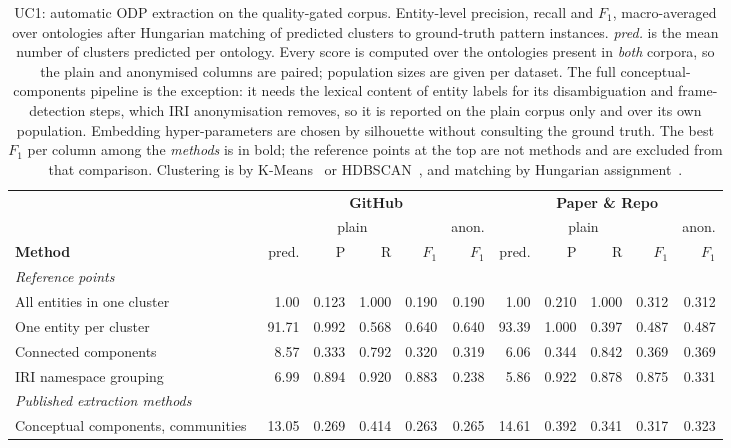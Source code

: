 \begin{table}[t]
\centering
\caption{UC1: automatic ODP extraction on the quality-gated corpus. Entity-level precision, recall and $F_1$, macro-averaged over ontologies after Hungarian matching of predicted clusters to ground-truth pattern instances. \emph{pred.} is the mean number of clusters predicted per ontology. Every score is computed over the ontologies present in \emph{both} corpora, so the plain and anonymised columns are paired; population sizes are given per dataset. The full conceptual-components pipeline is the exception: it needs the lexical content of entity labels for its disambiguation and frame-detection steps, which IRI anonymisation removes, so it is reported on the plain corpus only and over its own population. Embedding hyper-parameters are chosen by silhouette without consulting the ground truth. The best $F_1$ per column among the \emph{methods} is in bold; the reference points at the top are not methods and are excluded from that comparison. Clustering is by K-Means~\cite{lloyd1982kmeans} or HDBSCAN~\cite{campello2013hdbscan}, and matching by Hungarian assignment~\cite{kuhn1955hungarian}.}
\label{tab:uc1_all_methods}
\setlength{\tabcolsep}{4pt}
\footnotesize
\begin{tabular}{l|rrrr|r|rrrr|r}
\toprule
& \multicolumn{5}{c|}{\textbf{GitHub}} & \multicolumn{5}{c}{\textbf{Paper \& Repo}} \\
& \multicolumn{4}{c|}{plain} & anon. & \multicolumn{4}{c|}{plain} & anon. \\
\textbf{Method} & pred. & P & R & $F_1$ & $F_1$ & pred. & P & R & $F_1$ & $F_1$ \\
\midrule
\multicolumn{11}{l}{\textit{Reference points}} \\
All entities in one cluster & 1.00 & 0.123 & 1.000 & 0.190 & 0.190 & 1.00 & 0.210 & 1.000 & 0.312 & 0.312 \\
One entity per cluster & 91.71 & 0.992 & 0.568 & 0.640 & 0.640 & 93.39 & 1.000 & 0.397 & 0.487 & 0.487 \\
Connected components & 8.57 & 0.333 & 0.792 & 0.320 & 0.319 & 6.06 & 0.344 & 0.842 & 0.369 & 0.369 \\
IRI namespace grouping & 6.99 & 0.894 & 0.920 & 0.883 & 0.238 & 5.86 & 0.922 & 0.878 & 0.875 & 0.331 \\
\multicolumn{11}{l}{\textit{Published extraction methods}} \\
Conceptual components, communities~\cite{10.1145/3460210.3493542_extraction} & 13.05 & 0.269 & 0.414 & 0.263 & 0.265 & 14.61 & 0.392 & 0.341 & 0.317 & 0.323 \\

\end{tabular}
\end{table}
